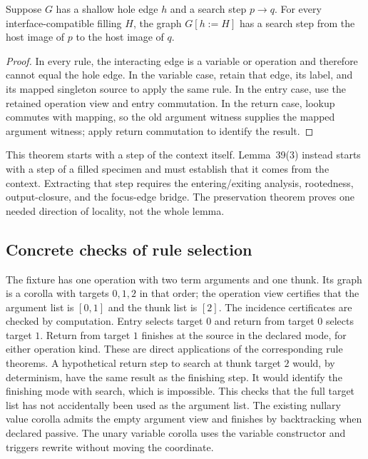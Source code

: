 \begin{theorem}
Suppose $G$ has a shallow hole edge $h$ and a search step $p\to q$. For every
interface-compatible filling $H$, the graph $G[h:=H]$ has a search step from
the host image of $p$ to the host image of $q$.
\end{theorem}
\begin{proof}
In every rule, the interacting edge is a variable or operation and therefore
cannot equal the hole edge. In the variable case, retain that edge, its label,
and its mapped singleton source to apply the same rule. In the entry case,
use the retained operation view and entry commutation. In the return case,
lookup commutes with mapping, so the old argument witness supplies the mapped
argument witness; apply return commutation to identify the result.
\end{proof}
This theorem starts with a step of the context itself. Lemma~39(3) instead
starts with a step of a filled specimen and must establish that it comes from
the context. Extracting that step requires the entering/exiting analysis,
rootedness, output-closure, and the focus-edge bridge. The preservation theorem
proves one needed direction of locality, not the whole lemma.

\subsection{Concrete checks of rule selection}
The fixture has one operation with two term arguments and one thunk. Its graph
is a corolla with targets $0,1,2$ in that order; the operation view certifies
that the argument list is $[0,1]$ and the thunk list is $[2]$. The incidence
certificates are checked by computation.
Entry selects target $0$ and return from target $0$ selects target $1$. Return
from target $1$ finishes at the source in the declared mode, for either operation
kind. These are direct applications of the corresponding rule theorems.
A hypothetical return step to search at thunk target $2$ would, by determinism,
have the same result as the finishing step. It would identify the finishing
mode with search, which is impossible. This checks that the full target list
has not accidentally been used as the argument list.
The existing nullary value corolla admits the empty argument view and finishes
by backtracking when declared passive. The unary variable corolla uses the
variable constructor and triggers rewrite without moving the coordinate.
